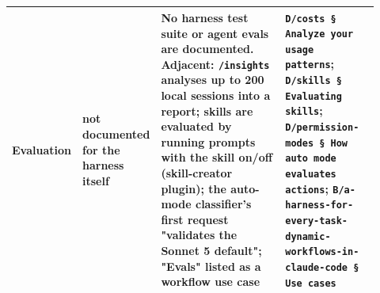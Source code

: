 \begin{longtable}{@{}p{0.13\linewidth}p{0.17\linewidth}p{0.36\linewidth}p{0.26\linewidth}@{}}
Evaluation & not documented for the harness itself & No harness test suite or agent evals are documented. Adjacent: \texttt{/\allowbreak{}insights} analyses up to 200 local sessions into a report; skills are evaluated by running prompts with the skill on/off (skill-creator plugin); the auto-mode classifier's first request "validates the Sonnet 5 default"; "Evals" listed as a workflow use case & \texttt{D/\allowbreak{}costs § Analyze your usage patterns}; \texttt{D/\allowbreak{}skills § Evaluating skills}; \texttt{D/\allowbreak{}permission-\allowbreak{}modes § How auto mode evaluates actions}; \texttt{B/\allowbreak{}a-\allowbreak{}harness-\allowbreak{}for-\allowbreak{}every-\allowbreak{}task-\allowbreak{}dynamic-\allowbreak{}workflows-\allowbreak{}in-\allowbreak{}claude-\allowbreak{}code § Use cases} \\
\bottomrule \end{longtable}

